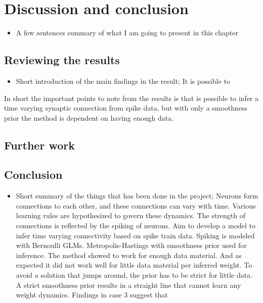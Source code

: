 
\chapter{Discussion and conclusion}

\begin{itemize}
    \item A few sentences summary of what I am going to present in this chapter
\end{itemize}

\section{Reviewing the results}

\begin{itemize}
    \item Short introduction of the main findings in the result; It is possible to 
\end{itemize}
In short the important points to note from the results is that is possible to infer a time varying synaptic connection from spike data, but with only a smoothness prior the method is dependent on having enough data. 



\section{Further work}

\section{Conclusion}

\begin{itemize}
    \item Short summary of the things that has been done in the project; Neurons form connections to each other, and these connections can vary with time. Various learning rules are hypothesized to govern these dynamics. The strength of connections is reflected by the spiking of neurons. Aim to develop a model to infer time varying connectivity based on spike train data. Spiking is modeled with Bernoulli GLMs. Metropolis-Hastings with smoothness prior used for inference. The method showed to work for enough data material. And as expected it did not work well for little data material per inferred weight. To avoid a solution that jumps around, the prior has to be strict for little data. A strict smoothness prior results in a straight line that cannot learn any weight dynamics. Findings in case 3 suggest that 
\end{itemize}



\cleardoublepage